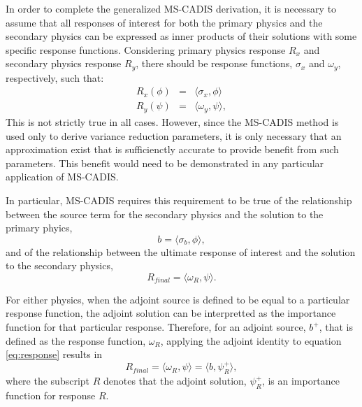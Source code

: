 In order to complete the generalized MS-CADIS derivation, it is necessary to
assume that all responses of interest for both the primary physics and the
secondary physics can be expressed as inner products of their solutions with
some specific response functions.  Considering primary physics response $R_x$
and secondary physics response $R_y$, there should be response functions,
$\sigma_x$ and $\omega_y$, respectively, such that:
\begin{eqnarray}
   R_x(\phi) &=& \langle \sigma_x , \phi \rangle\\
   R_y(\psi) &=& \langle \omega_y , \psi \rangle,
\end{eqnarray}
This is not strictly true in all cases.  However, since the
MS-CADIS method is used only to derive variance reduction parameters, it is
only necessary that an approximation exist that is sufficienctly accurate to
provide benefit from such parameters.  This benefit would need to be
demonstrated in any particular application of MS-CADIS.

In particular, MS-CADIS requires this requirement to be true of the
relationship between the source term for the secondary physics and the
solution to the primary phyics,
\begin{equation}\label{eq:coupling}
  b = \langle \sigma_b, \phi \rangle,
\end{equation}
and of the relationship between the ultimate response of interest and the
solution to the secondary physics,
\begin{equation} \label{eq:response}
  R_{final} = \langle \omega_R, \psi \rangle.
\end{equation}

For either physics, when the adjoint source is defined to be equal to a
particular response function, the adjoint solution can be interpretted as the
importance function for that particular response.  Therefore, for an adjoint source,
$b^{+}$, that is defined as the response function, $\omega_R$, applying the
adjoint identity to equation \ref{eq:response} results in
\begin{equation}
  R_{final} = \langle \omega_R, \psi \rangle = \langle b, \psi_R^{+}\rangle,
\end{equation}
where the subscript $R$ denotes that the adjoint solution, $\psi_R^{+}$, is an
importance function for response $R$.

